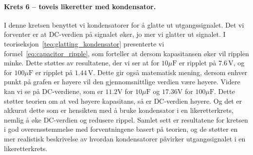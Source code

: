 \paragraph{Krets 6 -- toveis likeretter med kondensator. } I denne kretsen benyttet vi kondensatorer for å glatte ut utgangssignalet. Det vi forventer er at DC-verdien på signalet øker, jo mer vi glatter ut signalet. I teoriseksjon~\ref{teo:glatting_kondensator} presenterte vi formel~\ref{eq:capacitor_ripple}, som forteller at dersom kapasitansen øker vil ripplen minke. Dette støttes av resultatene, der vi ser at for $10\mu\text{F}$ er ripplet på $7.6\,\mathrm{V}$, og for $100\mu\text{F}$ er ripplet på $1.44\,\mathrm{V}$. Dette gir også matematisk mening, dersom enhver punkt på grafen er høyere vil den gjennomsnittlige verdien være høyere. Videre kan vi se på DC-verdiene, som er $11.2\text{V}$ for $10\mu\text{F}$ og $17.36\text{V}$ for $100\mu\text{F}$. Dette støtter teorien om at ved høyere kapasitans, så er DC-verdien høyere. Og det er akkurat dette som er hensikten med å bruke kondensator i en likeretterkrets, nemlig å øke DC-verdien og redusere rippel. Samlet sett er resultatene for kretsen i god overensstemmelse med forventningene basert på teorien, og de støtter en mer realistisk beskrivelse av hvordan kondensatorer påvirker utgangssignalet i en likeretterkrets.



